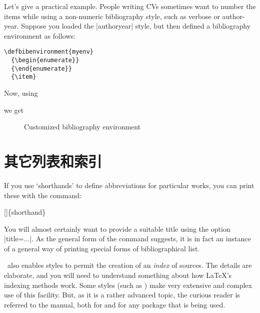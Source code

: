 Let's give a practical example. People writing CVs sometimes want to
number the items while using a non-numeric bibliography style, such as
verbose or author-year. Suppose you loaded the |authoryear| style, but
then defined a bibliography environment as follows:
\begin{verbatim}
\defbibenvironment{myenv}
  {\begin{enumerate}}
  {\end{enumerate}}
  {\item}
\end{verbatim}
Now, using
\begin{pseudoverb}
\relax[env=myenv,heading=myheading]
\end{pseudoverb}
we get

\begin{figure}
\caption{Customized bibliography environment\label{custom-env}}
\end{figure}

\section{其它列表和索引}

If you use `shorthands' to define abbreviations for particular works, you can print these with the command:
\begin{pseudoverb}
  \centering
  []\{shorthand\}
\end{pseudoverb}

You will almost certainly want to provide a suitable title using the
option |title=...|. As the general form of the command suggests, it is
in fact an instance of a general way of printing special forms of
bibliographical list.

\biblatex\ also enables styles to permit the creation of an
\emph{index} of sources. The details are elaborate, and you will need
to understand something about how \LaTeX's indexing methods work. Some
styles (such as ) make very extensive and complex use
of this facility. But, as it is a rather advanced topic, the curious
reader is referred to the manual, both for \biblatex{}
and for any package that is being used.

